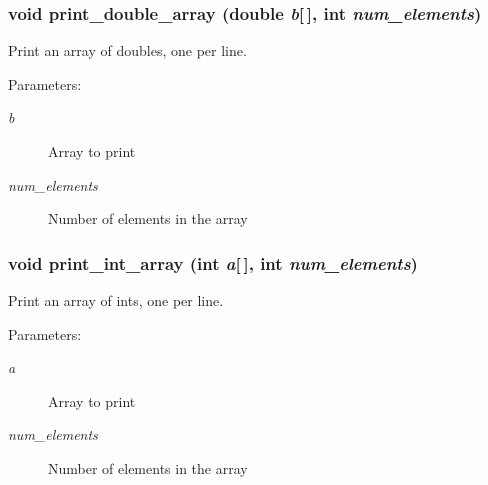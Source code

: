 \subsubsection{\setlength{\rightskip}{0pt plus 5cm}void print\_\-double\_\-array (double {\em b}[$\,$], int {\em num\_\-elements})}\label{print__arrays_8c_01dd24c106289d52bd401590a8b02ec8}


Print an array of doubles, one per line. \begin{Desc}
\item[Parameters:]
\begin{description}
\item[{\em b}]Array to print \item[{\em num\_\-elements}]Number of elements in the array \end{description}
\end{Desc}
\subsubsection{\setlength{\rightskip}{0pt plus 5cm}void print\_\-int\_\-array (int {\em a}[$\,$], int {\em num\_\-elements})}\label{print__arrays_8c_425daf4767c614afadb74cfb2b0a7a4f}


Print an array of ints, one per line. \begin{Desc}
\item[Parameters:]
\begin{description}
\item[{\em a}]Array to print \item[{\em num\_\-elements}]Number of elements in the array \end{description}
\end{Desc}
